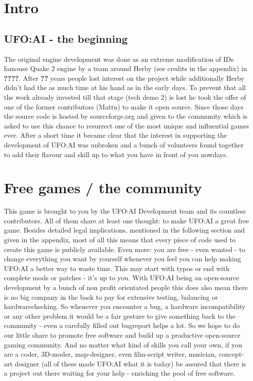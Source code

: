 \section{Intro}

\subsection{UFO:AI - the beginning}
The original engine development was done as an extreme modification of IDs famouse Quake 2 engine by a team around Herby (see credits in the appendix) in \textbf{????}. After \textbf{??} years people lost interest on the project while additionally Herby didn't had the as much time at his hand as in the early days.
To prevent that all the work already invested till that stage (tech demo 2) is lost he took the offer of one of the former contributors (Mattn) to make it open source.  Since those days the source code is hosted by sourceforge.org and given to the community which is asked to use this chance to resurrect one of the most unique and influential games ever. After a short time it became clear that the interest in supporting the development of UFO:AI was unbroken and a bunch of volunteers found together to add their flavour and skill up to what you have in front of you nowdays.

\section{Free games / the community}
This game is brought to you by the UFO:AI Development team and its countless contributors. All of them share at least one thought: to make UFO:AI a great free %
 game. Besides detailed legal implications, mentioned in the following section and given in the appendix, most of all this means that every piece of code used to create this game is publicly available. Even more: you are free - even wanted - to change everything you want by yourself whenever you feel you can help making UFO:AI a better way to waste time. This may start with typos or end with complete mods or patches - it's up to you. With UFO:AI being an open-source development by a bunch of non profit orientated people this does also mean there is no big company in the back to pay for extensive testing, balancing or hardwarechecking. So whenever you encounter a bug, a hardware incompatibility or any other problem it would be a fair gesture to give something back to the community - even a carefully filled out bugreport helps a lot. So we hope to do our little share to promote free software and build up a productive open-source gaming community. And no matter what kind of skills you call your own, if you are a coder, 3D-moder, map-designer, even film-script writer, musician, concept-art designer (all of these made UFO:AI what it is today) be assured that there is a project out there waiting for your help - enriching the pool of free software.

